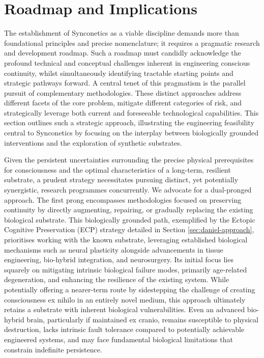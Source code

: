 \documentclass[10pt]{article}
\begin{document}
\begin{sloppypar}
  \section{Roadmap and Implications}
  \label{sec:roadmap}


  The establishment of Synconetics as a viable discipline demands more than foundational principles and precise nomenclature; it requires a pragmatic research and development roadmap. Such a roadmap must candidly acknowledge the profound technical and conceptual challenges inherent in engineering conscious continuity, whilst simultaneously identifying tractable starting points and strategic pathways forward. A central tenet of this pragmatism is the parallel pursuit of complementary methodologies. These distinct approaches address different facets of the core problem, mitigate different categories of risk, and strategically leverage both current and foreseeable technological capabilities. This section outlines such a strategic approach, illustrating the engineering feasibility central to Synconetics by focusing on the interplay between biologically grounded interventions and the exploration of synthetic substrates.

  Given the persistent uncertainties surrounding the precise physical prerequisites for consciousness and the optimal characteristics of a long-term, resilient substrate, a prudent strategy necessitates pursuing distinct, yet potentially synergistic, research programmes concurrently. We advocate for a dual-pronged approach. The first prong encompasses methodologies focused on preserving continuity by directly augmenting, repairing, or gradually replacing the existing biological substrate. This biologically grounded path, exemplified by the Ectopic Cognitive Preservation (ECP) strategy detailed in Section \ref{sec:daniel-approach}, prioritises working with the known substrate, leveraging established biological mechanisms such as neural plasticity alongside advancements in tissue engineering, bio-hybrid integration, and neurosurgery. Its initial focus lies squarely on mitigating intrinsic biological failure modes, primarily age-related degeneration, and enhancing the resilience of the existing system. While potentially offering a nearer-term route by sidestepping the challenge of creating consciousness ex nihilo in an entirely novel medium, this approach ultimately retains a substrate with inherent biological vulnerabilities. Even an advanced bio-hybrid brain, particularly if maintained ex cranio, remains susceptible to physical destruction, lacks intrinsic fault tolerance compared to potentially achievable engineered systems, and may face fundamental biological limitations that constrain indefinite persistence.


\end{sloppypar}
\end{document}
